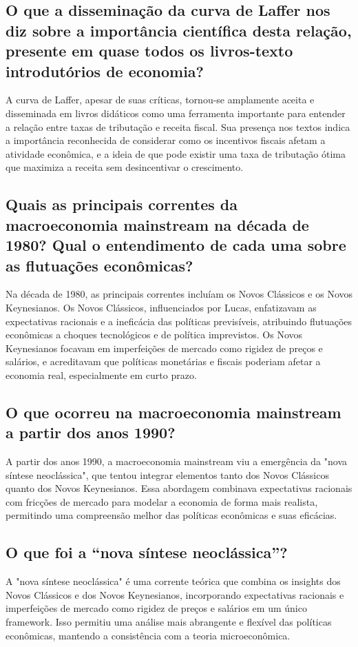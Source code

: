\documentclass[a4paper,12pt]{article}[abntex2]
\begin{document}
\subsection{\textbf{O que a disseminação da curva de Laffer nos diz sobre a importância científica desta relação, presente em quase todos os livros-texto introdutórios de economia?}}
A curva de Laffer, apesar de suas críticas, tornou-se amplamente aceita e disseminada em livros didáticos como uma ferramenta importante para entender a relação entre taxas de tributação e receita fiscal. Sua presença nos textos indica a importância reconhecida de considerar como os incentivos fiscais afetam a atividade econômica, e a ideia de que pode existir uma taxa de tributação ótima que maximiza a receita sem desincentivar o crescimento.

\subsection{\textbf{Quais as principais correntes da macroeconomia mainstream na década de 1980? Qual o entendimento de cada uma sobre as flutuações econômicas?}}
Na década de 1980, as principais correntes incluíam os Novos Clássicos e os Novos Keynesianos. Os Novos Clássicos, influenciados por Lucas, enfatizavam as expectativas racionais e a ineficácia das políticas previsíveis, atribuindo flutuações econômicas a choques tecnológicos e de política imprevistos. Os Novos Keynesianos focavam em imperfeições de mercado como rigidez de preços e salários, e acreditavam que políticas monetárias e fiscais poderiam afetar a economia real, especialmente em curto prazo.

\subsection{\textbf{O que ocorreu na macroeconomia mainstream a partir dos anos 1990?}}
A partir dos anos 1990, a macroeconomia mainstream viu a emergência da "nova síntese neoclássica", que tentou integrar elementos tanto dos Novos Clássicos quanto dos Novos Keynesianos. Essa abordagem combinava expectativas racionais com fricções de mercado para modelar a economia de forma mais realista, permitindo uma compreensão melhor das políticas econômicas e suas eficácias.

\subsection{\textbf{O que foi a “nova síntese neoclássica”?}}
A "nova síntese neoclássica" é uma corrente teórica que combina os insights dos Novos Clássicos e dos Novos Keynesianos, incorporando expectativas racionais e imperfeições de mercado como rigidez de preços e salários em um único framework. Isso permitiu uma análise mais abrangente e flexível das políticas econômicas, mantendo a consistência com a teoria microeconômica.
\end{document}
